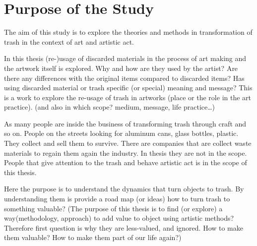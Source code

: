 

\section{Purpose of the Study}

The aim of this study is to explore the theories and methods in transformation of trash in the context of art and artistic act.

In this thesis (re-)usage of discarded materials in the process of art making and the artwork itself is explored. Why and how are they used by the artist? Are there any differences with the original items compared to discarded items? Has using discarded material or trash specific (or special) meaning and message? This is a work to explore the re-usage of trash in artworks (place or the role in the art practice). (and also in which scope? medium, message, life practice\ldots) 

As many people are inside the business of transforming trash through craft and so on. People on the streets looking for aluminum cans, glass bottles, plastic. They collect and sell them to survive. There are companies that are collect waste materials to regain them again the industry. In thesis they are not in the scope. People that give attention to the trash and behave artistic act is in the scope of this thesis.

 Here the purpose is to understand the dynamics that turn objects to trash. By understanding them is provide a road map (or ideas) how to turn trash to something valuable? (The purpose of this thesis is to find (or explore) a way(methodology, approach) to add value to object using artistic methods? Therefore first question is why they are less-valued, and ignored. How to make them valuable? How to make them part of our life again?)

